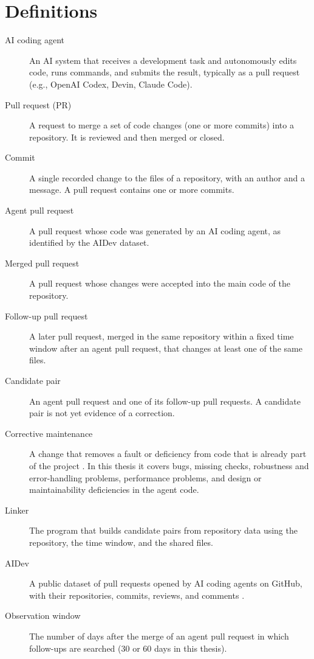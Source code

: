 \section{Definitions}
\label{sec:definitions}

\begin{description}
  \item[AI coding agent] An AI system that receives a development task and
  autonomously edits code, runs commands, and submits the result, typically as a
  pull request (e.g., OpenAI Codex, Devin, Claude Code).
  \item[Pull request (PR)] A request to merge a set of code changes (one or more
  commits) into a repository. It is reviewed and then merged or closed.
  \item[Commit] A single recorded change to the files of a repository, with an
  author and a message. A pull request contains one or more commits.
  \item[Agent pull request] A pull request whose code was generated by an AI
  coding agent, as identified by the AIDev dataset.
  \item[Merged pull request] A pull request whose changes were accepted into the
  main code of the repository.
  \item[Follow-up pull request] A later pull request, merged in the same
  repository within a fixed time window after an agent pull request, that changes
  at least one of the same files.
  \item[Candidate pair] An agent pull request and one of its follow-up pull
  requests. A candidate pair is not yet evidence of a correction.
  \item[Corrective maintenance] A change that removes a fault or deficiency from
  code that is already part of the project \cite{swanson1976dimensions}. In this
  thesis it covers bugs, missing checks, robustness and error-handling problems,
  performance problems, and design or maintainability deficiencies in the agent
  code.
  \item[Linker] The program that builds candidate pairs from repository data
  using the repository, the time window, and the shared files.
  \item[AIDev] A public dataset of pull requests opened by AI coding agents on
  GitHub, with their repositories, commits, reviews, and comments
  \cite{li2026aidev}.
  \item[Observation window] The number of days after the merge of an agent pull
  request in which follow-ups are searched (30 or 60 days in this thesis).
\end{description}

